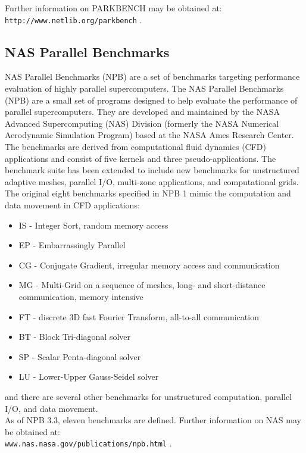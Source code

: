 Further information on PARKBENCH may be obtained at:\\
 \texttt{http://www.netlib.org/parkbench} .

\subsection*{NAS Parallel Benchmarks}

NAS Parallel Benchmarks (NPB) are a set of benchmarks targeting performance evaluation of highly parallel supercomputers. The NAS Parallel Benchmarks (NPB) are a small set of programs designed to help evaluate the performance of parallel supercomputers.  They are developed and maintained by the NASA Advanced Supercomputing (NAS) Division (formerly the NASA Numerical Aerodynamic Simulation Program) based at the NASA Ames Research Center.
The benchmarks are derived from computational fluid dynamics (CFD) applications and consist of five kernels and three pseudo-applications. The benchmark suite has been extended to include new benchmarks for unstructured adaptive meshes, parallel I/O, multi-zone applications, and computational grids. 
\\
The original eight benchmarks specified in NPB 1 mimic the computation and data movement in CFD applications:
\begin{itemize}
  \item IS - Integer Sort, random memory access
  \item EP - Embarrassingly Parallel
  \item CG - Conjugate Gradient, irregular memory access and communication
  \item MG - Multi-Grid on a sequence of meshes, long- and short-distance communication, memory intensive
  \item FT - discrete 3D fast Fourier Transform, all-to-all communication
  \item BT - Block Tri-diagonal solver
  \item SP - Scalar Penta-diagonal solver
  \item LU - Lower-Upper Gauss-Seidel solver
\end{itemize}
and there are several other benchmarks for unstructured computation, parallel I/O, and data movement.
\\
As of NPB 3.3, eleven benchmarks are defined. Further information on NAS may be obtained at: \\ \texttt{www.nas.nasa.gov/publications/npb.html} .
 
